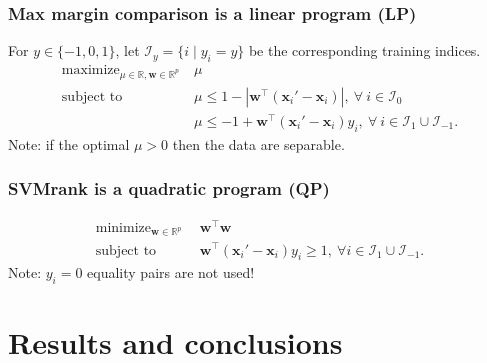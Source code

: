 \documentclass{beamer}
\DeclareMathOperator*{\maximize}{maximize}
\DeclareMathOperator*{\minimize}{minimize}
\newcommand{\RR}{\mathbb R}
\begin{document}
\begin{frame}
  \frametitle{Max margin comparison is a linear program (LP)}
  For $y\in\{-1,0,1\}$, let $\mathcal I_y=\{i\mid y_i=y\}$ be the
  corresponding training indices.
  \begin{equation*}
  \begin{aligned}
    \maximize_{\mu\in\RR, \mathbf w\in\RR^p}\ & \mu \\
    \text{subject to}\ & 
    \mu \leq 1-|\mathbf w^\intercal (\mathbf x_i' - \mathbf x_i)|,\
    \forall\  i\in \mathcal I_0\\
    &\mu \leq -1 +  
    \mathbf w^\intercal(\mathbf x_i'-\mathbf x_i)y_i,
    \ \forall\ i\in \mathcal I_1\cup \mathcal I_{-1}.
  \end{aligned}
\end{equation*}
Note: if the optimal $\mu>0$ then the data are separable.
\end{frame}

\begin{frame}
  \frametitle{SVMrank is a quadratic program (QP)}
  \begin{equation*}
    \begin{aligned}
          \minimize_{\mathbf w\in\RR^p}\ \  & \mathbf w^\intercal \mathbf w \\
          \text{subject to}\ \  & 
          \mathbf w^\intercal(\mathbf x_i'-\mathbf x_i)y_i \geq 1,
          \ \forall i\in \mathcal I_1\cup \mathcal I_{-1}.
    \end{aligned}
  \end{equation*}
Note: $y_i=0$ equality pairs are not used!
\end{frame}

\section{Results and conclusions}
\end{document}
